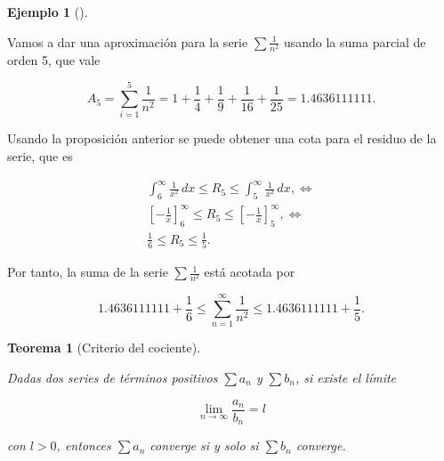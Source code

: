 \documentclass[
  a4paper,
]{scrreport}
\theoremstyle{definition}
\newtheorem{example}{Ejemplo}[chapter]
\theoremstyle{plain}
\theoremstyle{definition}
\theoremstyle{definition}
\theoremstyle{plain}
\newtheorem{theorem}{Teorema}[chapter]
\theoremstyle{plain}
\theoremstyle{remark}
\begin{document}
\begin{example}[]\protect\hypertarget{exm-residuo-acotado}{}\label{exm-residuo-acotado}

Vamos a dar una aproximación para la serie \(\sum \frac{1}{n^2}\) usando
la suma parcial de orden 5, que vale

\[
A_5 = \sum_{i=1}^5 \frac{1}{n^2} = 1+\frac{1}{4}+\frac{1}{9}+\frac{1}{16}+\frac{1}{25} = 1.4636111111.
\]

Usando la proposición anterior se puede obtener una cota para el residuo
de la serie, que es

\[
\begin{gathered}
\int_6^\infty \frac{1}{x^2}\,dx \leq R_5 \leq \int_5^\infty \frac{1}{x^2}\,dx, \Leftrightarrow \\
\left[-\frac{1}{x}\right]_6^\infty \leq R_5 \leq \left[-\frac{1}{x}\right]_5^\infty, \Leftrightarrow \\
\frac{1}{6} \leq R_5 \leq \frac{1}{5}.
\end{gathered}
\]

Por tanto, la suma de la serie \(\sum \frac{1}{n^2}\) está acotada por

\[
1.4636111111 + \frac{1}{6} \leq \sum_{n=1}^\infty \frac{1}{n^2} \leq 1.4636111111 + \frac{1}{5}.
\]

\end{example}

\begin{theorem}[Criterio del
cociente]\protect\hypertarget{thm-criterio-cociente}{}\label{thm-criterio-cociente}

Dadas dos series de términos positivos \(\sum a_n\) y \(\sum b_n\), si
existe el límite

\[
\lim_{n\to\infty} \frac{a_n}{b_n} = l
\]

con \(l>0\), entonces \(\sum a_n\) converge si y solo si \(\sum b_n\)
converge.

\end{theorem}
\end{document}
